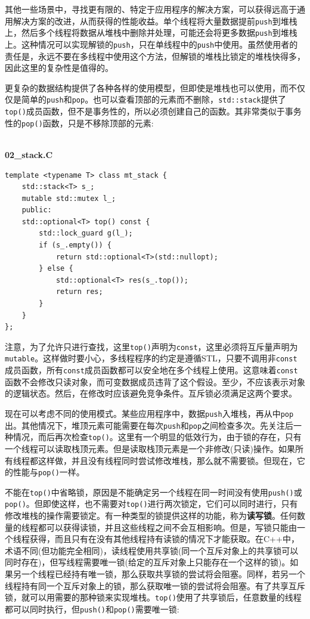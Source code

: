 其他一些场景中，寻找更有限的、特定于应用程序的解决方案，可以获得远高于通用解决方案的改进，从而获得的性能收益。单个线程将大量数据提前\texttt{push}到堆栈上，然后多个线程将数据从堆栈中删除并处理，可能还会将更多数据\texttt{push}到堆栈上。这种情况可以实现解锁的\texttt{push}，只在单线程中的\texttt{push}中使用。虽然使用者的责任是，永远不要在多线程中使用这个方法，但解锁的堆栈比锁定的堆栈快得多，因此这里的复杂性是值得的。

更复杂的数据结构提供了各种各样的使用模型，但即使是堆栈也可以使用，而不仅仅是简单的\texttt{push}和\texttt{pop}。也可以查看顶部的元素而不删除，\texttt{std::stack}提供了\texttt{top()}成员函数，但不是事务性的，所以必须创建自己的函数。其非常类似于事务性的\texttt{pop()}函数，只是不移除顶部的元素:

\hspace*{\fill} \\ %
\noindent
\textbf{02\_stack.C}
\begin{lstlisting}[style=styleCXX]
template <typename T> class mt_stack {
	std::stack<T> s_;
	mutable std::mutex l_;
	public:
	std::optional<T> top() const {
		std::lock_guard g(l_);
		if (s_.empty()) {
			return std::optional<T>(std::nullopt);
		} else {
			std::optional<T> res(s_.top());
			return res;
		}
	}
};
\end{lstlisting}

注意，为了允许只进行查找，这里\texttt{top()}声明为\texttt{const}，这里必须将互斥量声明为\texttt{mutable}。这样做时要小心，多线程程序的约定是遵循STL，只要不调用非\texttt{const}成员函数，所有\texttt{const}成员函数都可以安全地在多个线程上使用。这意味着\texttt{const}函数不会修改只读对象，而可变数据成员违背了这个假设。至少，不应该表示对象的逻辑状态。然后，在修改时应该避免竞争条件。互斥锁必须满足这两个要求。

现在可以考虑不同的使用模式。某些应用程序中，数据\texttt{push}入堆栈，再从中\texttt{pop}出。其他情况下，堆顶元素可能需要在每次\texttt{push}和\texttt{pop}之间检查多次。先关注后一种情况，而后再次检查\texttt{top()}。这里有一个明显的低效行为，由于锁的存在，只有一个线程可以读取栈顶元素。但是读取栈顶元素是一个非修改(只读)操作。如果所有线程都这样做，并且没有线程同时尝试修改堆栈，那么就不需要锁。但现在，它的性能与\texttt{pop()}一样。

不能在\texttt{top()}中省略锁，原因是不能确定另一个线程在同一时间没有使用\texttt{push()}或\texttt{pop()}。但即使这样，也不需要对\texttt{top()}进行两次锁定，它们可以同时进行，只有修改堆栈的操作需要锁定。有一种类型的锁提供这样的功能，称为\textbf{读写锁}。任何数量的线程都可以获得读锁，并且这些线程之间不会互相影响。但是，写锁只能由一个线程获得，而且只有在没有其他线程持有读锁的情况下才能获取。在C++中，术语不同(但功能完全相同)，读线程使用共享锁(同一个互斥对象上的共享锁可以同时存在)，但写线程需要唯一锁(给定的互斥对象上只能存在一个这样的锁)。如果另一个线程已经持有唯一锁，那么获取共享锁的尝试将会阻塞。同样，若另一个线程持有同一个互斥对象上的锁，那么获取唯一锁的尝试将会阻塞。有了共享互斥锁，就可以用需要的那种锁来实现堆栈。\texttt{top()}使用了共享锁后，任意数量的线程都可以同时执行，但\texttt{push()}和\texttt{pop()}需要唯一锁:

